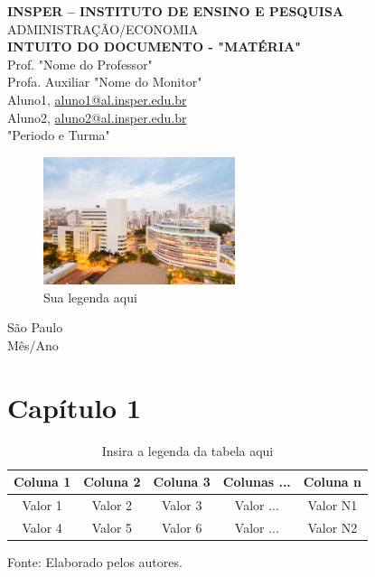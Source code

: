 \documentclass[12pt]{article}
\begin{document}
\begin{titlepage}
    \centering
    \vspace*{1cm}
    \Large\textbf{INSPER – INSTITUTO DE ENSINO E PESQUISA}\\
    \Large ADMINISTRAÇÃO/ECONOMIA\\
    \vspace{1.5cm}
    \Large\textbf{INTUITO DO DOCUMENTO - "MATÉRIA"}\\
    \vspace{1.5cm}
    Prof. "Nome do Professor"\\
    Profa. Auxiliar "Nome do Monitor"\\
    \vfill
    \normalsize
    Aluno1, \href{mailto:aluno1@al.insper.edu.br}{aluno1@al.insper.edu.br}\\
    Aluno2, \href{mailto:aluno21@al.insper.edu.br}{aluno2@al.insper.edu.br}\\
    "Periodo e Turma"\\
    \begin{figure}[h]
    \centering
    \includegraphics[width=0.5\textwidth]{campus-insper-22.jpg}
    \caption{Sua legenda aqui} 
    \label{fig:my_label}
    \end{figure}
    \vfill
    São Paulo\\
    Mês/Ano
\end{titlepage}

\newpage
\tableofcontents
\thispagestyle{empty} %
\newpage
\setcounter{page}{1} %
\justify
\onehalfspacing

\pagestyle{fancy}
\fancyhf{}
\rhead{\thepage}

\section{\textbf{Capítulo 1}}
\begin{table}[H]
\centering
\caption{Insira a legenda da tabela aqui}
\begin{tabular}{|c|c|c|c|c|}
\hline
\textbf{Coluna 1} & \textbf{Coluna 2} & \textbf{Coluna 3} & \textbf{Colunas ...} & \textbf{Coluna n} \\ \hline
Valor 1           & Valor 2           & Valor 3           & Valor ...    & Valor N1          \\ \hline
Valor 4           & Valor 5           & Valor 6           & Valor ...    & Valor N2          \\ \hline
\end{tabular}
\label{tab:my_label}

\footnotesize{Fonte: Elaborado pelos autores.}
\end{table}
\end{document}
